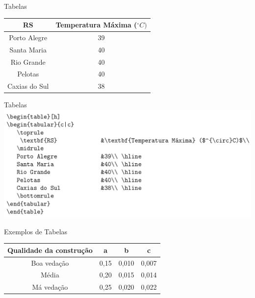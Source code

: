 \documentclass[c]{beamer}
\begin{document}
{\begin{frame}[fragile]{\sc Tabelas}
	\begin{table}[h]
		\begin{tabular}{c|c} 
			\toprule
			\textbf{RS}             &\textbf{Temperatura Máxima} ($^{\circ}C)$\\
			\midrule
			Porto Alegre             &39\\ \hline
			Santa Maria              &40\\ \hline
			Rio Grande               &40\\ \hline
			Pelotas                  &40\\ \hline
			Caxias do Sul            &38\\ \hline 
			\bottomrule
		\end{tabular}
	\end{table}
\end{frame}

\begin{frame}[fragile]{\sc Tabelas}
	\centering
	\includegraphics[scale=0.3]{images/exemplo_tabela.png}
\end{frame}
%
\begin{frame}[fragile]{\sc Exemplos de Tabelas}
\begin{table}[h]
\begin{tabular}{c|c|c|c} 
				\toprule
				\textbf{Qualidade da construção}       &\textbf{a}                       &\textbf{b}                     &\textbf{c}\\
				\midrule
				Boa vedação                   &0,15                    &0,010                 &0,007\\
				Média                         &0,20                    &0,015                 &0,014\\
				Má vedação                    &0,25                    &0,020                 &0,022\\
				\bottomrule 
\end{tabular}
\end{table}
		

\end{frame}}
\end{document}

